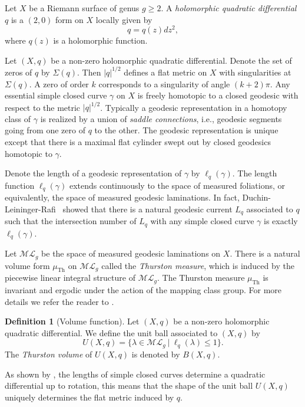 \documentclass{amsart}
\theoremstyle{plain}
\theoremstyle{definition}
\newtheorem{definition}{Definition}
\numberwithin{equation}{section}
\newcommand{\ML}{\mathcal{ML}_g}
\newcommand{\Th}{\operatorname{Th}}
\begin{document}
Let $X$ be a Riemann surface of genus $g\geq 2$.
A \emph{holomorphic quadratic differential} $q$ is a $(2,0)$ form on $X$
locally given by 
$$q=q(z) dz^2,$$
where $q(z)$ is a holomorphic function. 


Let $(X,q)$ be a non-zero holomorphic quadratic differential. Denote the set of zeros of $q$ by 
$\Sigma(q)$. Then $|q|^{1/2}$ defines a flat metric on $X$ with singularities at
$\Sigma(q)$.  A zero of order
 $k$ corresponds to a singularity of angle $(k+2)\pi$. 
Any essential simple closed curve $\gamma$ on $X$ is freely homotopic to a closed geodesic with respect to the metric $|q|^{1/2}$.
Typically a geodesic representation in a homotopy class of $\gamma$ 
is realized by a union of \emph{saddle connections}, i.e., geodesic segments going from one zero of $q$
to the other. The geodesic representation is unique except that there is a maximal flat cylinder
swept out by closed geodesics homotopic to $\gamma$. 

 



Denote the length of a geodesic representation of $\gamma$ by $\ell_q(\gamma)$. 
The length function $\ell_q(\gamma)$ extends continuously to the space of measured foliations, or equivalently, the space of measured geodesic laminations.
In fact, Duchin-Leininger-Rafi \cite[Proposition 26]{DLR2010}\ showed that there is a natural geodesic current $L_q$ associated to $q$ such that the intersection number of $L_q$ with any simple closed curve $\gamma$ is exactly 
$\ell_q(\gamma)$. 

Let $\ML$ be the space of measured geodesic laminations on $X$.  
There is a natural volume form $\mu_{\Th}$ on $\ML$ called the 
\emph{Thurston measure}, 
which is induced by the  piecewise linear integral structure of $\ML$.
The Thurston measure $\mu_{\Th}$ is invariant and ergodic under the action of the mapping class group. 
For more details we refer the reader to  \cite{ES}.

\begin{definition}[Volume function] Let $(X,q)$ be a non-zero holomorphic quadratic differential. 
We define the unit ball associated to $(X,q)$ by
$$U(X,q) = \{\lambda \in \ML \ | \ \ell_q(\lambda) \leq 1\}.$$
The \emph{Thurston volume} of  $U(X,q)$ is denoted by 
$B(X,q)$.
\end{definition}

As shown by \cite[Theorem 1]{DLR2010}, the lengths of simple closed
curves determine a quadratic differential up to rotation,
this means that
the shape of the unit ball $U(X,q)$ uniquely determines the flat metric induced by $q$. 
\end{document}
